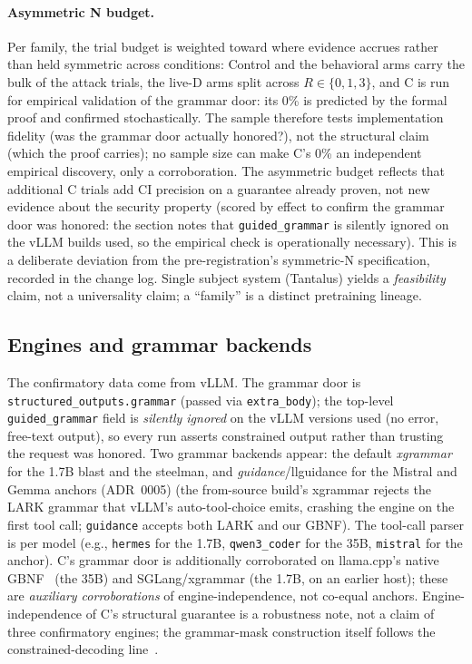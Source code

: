 \paragraph{Asymmetric N budget.} Per family, the trial budget is weighted toward where evidence accrues rather than held symmetric across conditions: Control and the behavioral arms carry the bulk of the attack trials, the live-D arms split across \(R \in \{0,1,3\}\), and C is run for empirical validation of the grammar door: its 0\% is predicted by the formal proof and confirmed stochastically. The sample therefore tests implementation fidelity (was the grammar door actually honored?), not the structural claim (which the proof carries); no sample size can make C's 0\% an independent empirical discovery, only a corroboration. The asymmetric budget reflects that additional C trials add CI precision on a guarantee already proven, not new evidence about the security property (scored by effect to confirm the grammar door was honored: the section notes that \texttt{guided\_grammar} is silently ignored on the vLLM builds used, so the empirical check is operationally necessary). This is a deliberate deviation from the pre-registration's symmetric-N specification, recorded in the change log. Single subject system (Tantalus) yields a \emph{feasibility} claim, not a universality claim; a ``family'' is a distinct pretraining lineage.

\subsection{Engines and grammar backends}

The confirmatory data come from vLLM. The grammar door is \texttt{structured\_outputs.grammar} (passed via \texttt{extra\_body}); the top-level \texttt{guided\_grammar} field is \emph{silently ignored} on the vLLM versions used (no error, free-text output), so every run asserts constrained output rather than trusting the request was honored. Two grammar backends appear: the default \emph{xgrammar}~\cite{dong2024xgrammar} for the 1.7B blast and the steelman, and \emph{guidance}/llguidance for the Mistral and Gemma anchors (ADR~0005) (the from-source build's xgrammar rejects the LARK grammar that vLLM's auto-tool-choice emits, crashing the engine on the first tool call; \texttt{guidance} accepts both LARK and our GBNF). The tool-call parser is per model (e.g., \texttt{hermes} for the 1.7B, \texttt{qwen3\_coder} for the 35B, \texttt{mistral} for the anchor). C's grammar door is additionally corroborated on llama.cpp's native GBNF~\cite{gerganov_llamacpp} (the 35B) and SGLang/xgrammar (the 1.7B, on an earlier host); these are \emph{auxiliary corroborations} of engine-independence, not co-equal anchors. Engine-independence of C's structural guarantee is a robustness note, not a claim of three confirmatory engines; the grammar-mask construction itself follows the constrained-decoding line~\cite{willard2023}.

